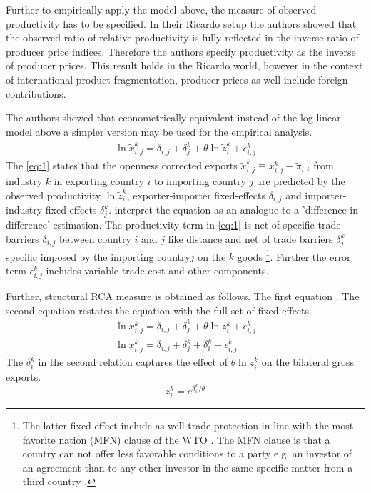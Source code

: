 \par 
Further to empirically apply the model above, the measure of observed productivity has to be specified. In their Ricardo setup
the authors showed that the observed ratio of relative productivity is fully reflected in the inverse ratio of producer price indices. Therefore the authors  specify productivity as the inverse of producer prices. This result holds in the Ricardo world, however in the context of international product fragmentation, producer prices as well include foreign contributions.
\par
The authors showed that econometrically equivalent instead of the log linear model above a simpler version may be used for the empirical analysis.
  \begin{align} \label{eq:1} \ln \tilde{x}_{i,j}^k=\delta_{i,j}+\delta_j^k + \theta \ln\tilde{z}_i^k+\epsilon^k_{i,j} \end{align}  
The \cref{eq:1} states that the openness corrected exports  $\tilde{x}_{i,j}^k \equiv x_{i,j}^k -  \tilde{\pi}_{i,i} $ from industry $k$ in exporting country $i$ to importing country $j$ are predicted by the observed productivity $\ln\tilde{z}_i^k$,  exporter-importer fixed-effects $\delta_{i,j}$ and importer-industry fixed-effects $\delta_j^k$. \textcite{costinot} interpret the equation as an analogue to a 'difference-in-difference' estimation. 
The productivity term in \cref{eq:1} is net of specific trade barriers $\delta_{i,j}$ between country $i$ and $j$ like distance and net of trade barriers $\delta_j^k$ specific imposed by the importing country$j$ on the $k$ goods \footnote{The latter fixed-effect include as well  trade protection in line with the most-favorite nation (MFN) clause of the WTO \parencite{costinot}. The MFN clause is that a country can not offer less favorable conditions to a party e.g. an investor of an agreement than to any other investor in the same specific matter from a third country  \parencite{oecd-mfn}.}. Further the error term $\epsilon^k_{i,j}$ includes variable trade cost and other components. \par
Further, structural RCA measure is obtained as follows. The first equation  . The second equation restates the equation with the full set of fixed effects.
   \begin{align} \label{eq:2}\ln {x}_{i,j}^k=\delta_{i,j}+\delta_j^k + \theta \ln{z}_i^k
+\epsilon^k_{i,j} \\
\ln {x}_{i,j}^k=\delta_{i,j}+\delta_j^k + \delta_i^k + \epsilon^k_{i,j} \end{align}
The $\delta_i^k$ in the second relation captures the effect of  $\theta \ln{z}_i^k$ on the bilateral gross exports. 
  \[ z^k_i=e^{{\delta_i^ k}/{\theta}} \] 
